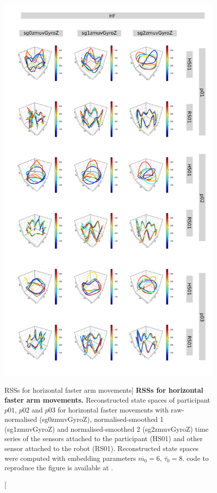 \begin{figure}
\centering
\includegraphics[height=0.85\textheight]{rss_HF}
\caption
	[RSSs for horizontal faster arm movements]{
	{\bf RSSs for horizontal faster arm movements.}
	Reconstructed state spaces %
	of participant $p01$, $p02$ and $p03$ for horizontal faster movements 
	with raw-normalised (sg0zmuvGyroZ), 
	normalised-smoothed 1 (sg1zmuvGyroZ) and 
	normalised-smoothed 2 (sg2zmuvGyroZ) time series of the 
	sensors attached to the participant (HS01) and other sensor 
	attached to the robot (RS01).	
	Reconstructed state spaces were computed with 
	embedding parameters $\overline{m_0}=6$, $\overline{\tau_0}=8$.
	\R code to reproduce the figure is available at 
	.
        }
    \label{fig:rss_HF}
\end{figure}




